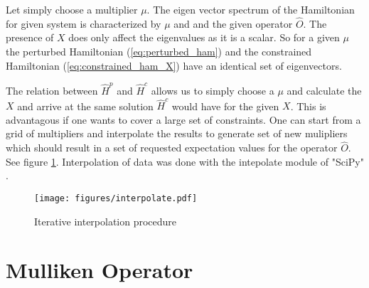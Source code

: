   Let simply choose a multiplier $\mu$. The eigen vector spectrum of the Hamiltonian for given system is characterized by $\mu$ and and the given operator $\hat{O}$. The presence of $X$ does only affect the eigenvalues as it is a scalar. So for a given $\mu$ the perturbed Hamiltonian (\ref{eq:perturbed_ham}) and the constrained Hamiltonian (\ref{eq:constrained_ham_X}) have an identical set of eigenvectors.

  The relation between $\hat{H}^{p}$ and $\hat{H}^c$ allows us to simply choose a $\mu$ and calculate the $X$ and arrive at the same solution $\hat{H}^c$ would have for the given $X$. This is advantagous if one wants to cover a large set of constraints. One can start from a grid of multipliers and interpolate the results to generate set of new mulipliers which should result in a set of requested expectation values for the operator $\hat{O}$. See figure \ref{fig:alg1}. Interpolation of data was done with the intepolate module of "SciPy" \cite{scipy}.

  \begin{figure}[h!]
    \texttt{[image: figures/interpolate.pdf]}
    \caption{Iterative interpolation procedure}
    \label{fig:alg1}
  \end{figure}

\section{Mulliken Operator}

